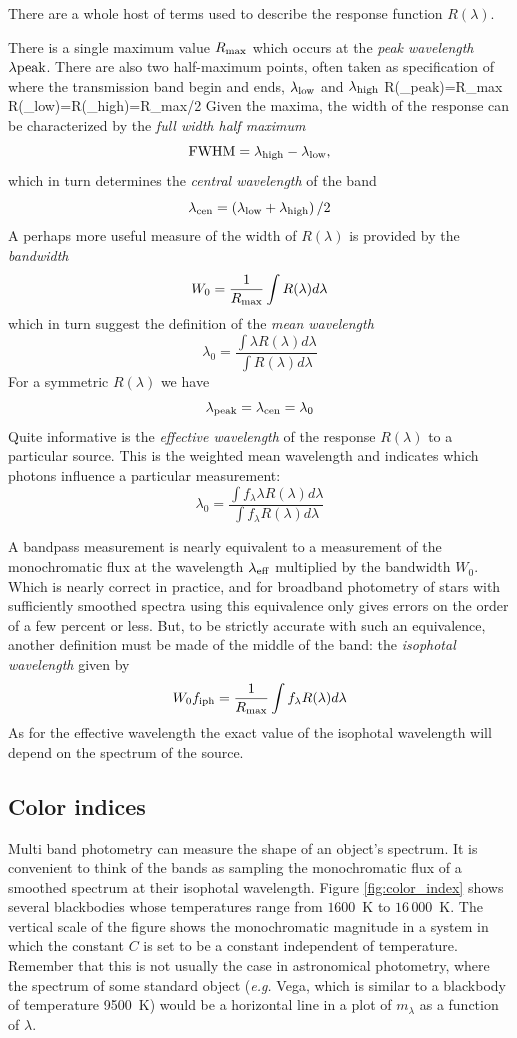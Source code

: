 There are a whole host of terms used to describe the response
function $R(\lambda)$. 

There is a single maximum value $R_{\rm max}$  which occurs at the
{\it peak wavelength} $\lambda{\rm peak}$. There are also two
half-maximum points, often taken as specification of where the
transmission band begin and ends, $\lambda_{\rm low}$ and
$\lambda_{\rm high}$
\bua
R(\lambda_{\rm peak})=R_{\rm max} \\
R(\lambda_{\rm low})=R(\lambda_{\rm high})={R_{\rm max}/2}
\eua
Given the maxima, the width of the response can be characterized by
the {\it full width half maximum}
\[
{\rm FWHM}=\lambda_{\rm high}-\lambda_{\rm low},
\]
which in turn determines the {\it central wavelength} of the band
\[
\lambda_{\rm cen}={\left(\lambda_{\rm low}+\lambda_{\rm
      high}\right)/2}
\]
A perhaps more useful measure of the width of $R(\lambda)$ is provided
by the {\it bandwidth}
\[
W_0=\frac{1}{R_{\rm max}}\int R(\lambda)d\lambda
\]
which in turn suggest the definition of the {\it mean wavelength}
\[
\lambda_0=\frac{\int\lambda R(\lambda)d\lambda}{\int
  R(\lambda)d\lambda}
\]
For a symmetric $R(\lambda)$ we have
\[
\lambda_{\rm peak}=\lambda_{\rm cen}=\lambda_0
\]
Quite informative is the {\it effective wavelength} of the response
$R(\lambda)$ to a particular source. This is the weighted mean
wavelength and indicates which photons influence a particular
measurement:
\[
\lambda_0=\frac{\int f_\lambda\lambda R(\lambda)d\lambda}{\int
  f_\lambda R(\lambda)d\lambda}
\]

A bandpass measurement is nearly equivalent to a measurement of the
monochromatic flux at the wavelength $\lambda_{\rm eff}$ multiplied by
the bandwidth $W_0$. Which is nearly correct in practice, and for
broadband photometry of stars with sufficiently smoothed spectra using
this equivalence only gives errors on the order of a few percent or
less. But, to be strictly accurate with such an equivalence, another
definition must be made of the middle of the band: the {\it isophotal
  wavelength} given by
\[
W_0f_{\rm iph}=\frac{1}{R_{\rm max}}\int f_\lambda R(\lambda)d\lambda
\]
As for the effective wavelength the exact value of the isophotal
wavelength will depend on the spectrum of the source. 

\subsection{Color indices}

Multi band photometry can measure the shape of an object's
spectrum. It is convenient to think of the bands as sampling the
monochromatic flux of a smoothed spectrum at their isophotal
wavelength. Figure \ref{fig:color_index} shows several blackbodies
whose temperatures range from $1600$~K to $16\,000$~K. The vertical
scale of the figure shows the monochromatic magnitude in a system in
which the constant $C$ is set to be a constant independent of
temperature. Remember that this is not usually the case in
astronomical photometry, where the spectrum of some standard object
({\it e.g.} Vega, which is similar to a blackbody of temperature
9500~K) would be a horizontal line in a plot of $m_\lambda$ as a
function of $\lambda$. 

